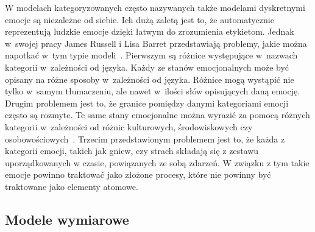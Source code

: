 W modelach kategoryzowanych często nazywanych także modelami dyskretnymi emocje są niezależne od siebie. Ich dużą zaletą jest to, że automatycznie reprezentują ludzkie emocje dzięki łatwym do zrozumienia etykietom. Jednak w~swojej pracy James Russell i Lisa Barret przedstawiają problemy, jakie można napotkać w~tym typie modeli~\cite{russel_barret_core_affect}. Pierwszym są różnice występujące w~nazwach kategorii w~zależności od języka. Każdy ze stanów emocjonalnych może być opisany na różne sposoby w~zależności od języka. Różnice mogą wystąpić nie tylko w~samym tłumaczeniu, ale nawet w~ilości słów opisujących daną emocję. Drugim problemem jest to, że granice pomiędzy danymi kategoriami emocji często są rozmyte. Te same stany emocjonalne można wyrazić za pomocą różnych kategorii w~zależności od różnic kulturowych, środowiskowych czy osobowościowych~\cite{emotion_models_review_2017}. Trzecim przedstawionym problemem jest to, że każda z kategorii emocji, takich jak gniew, czy strach składają się z zestawu uporządkowanych w czasie, powiązanych ze sobą zdarzeń. W związku z tym takie emocje powinno traktować jako złożone procesy, które nie powinny być traktowane jako elementy atomowe.

\subsection{Modele wymiarowe}

